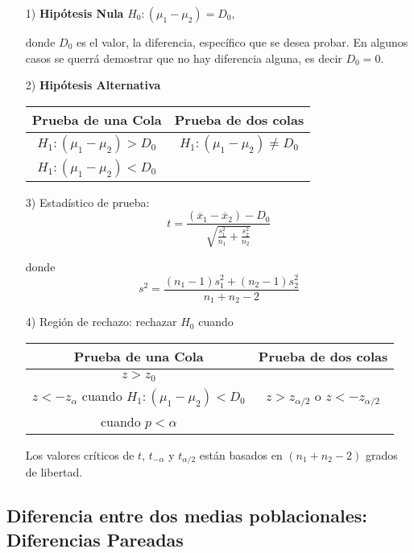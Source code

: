 \begin{itemize}
\begin{itemize}
\item[1) ] \textbf{Hip\'otesis Nula} $H_{0}:\left(\mu_{1}-\mu_{2}\right)=D_{0}$,\medskip

donde $D_{0}$ es el valor, la diferencia, espec\'ifico que se desea probar. En algunos casos se querr\'a demostrar que no hay diferencia alguna, es decir $D_{0}=0$.

\item[2) ] \textbf{Hip\'otesis Alternativa}
\begin{tabular}{cc}\hline
\textbf{Prueba de una Cola} & \textbf{Prueba de dos colas}\\\hline
$H_{1}:\left(\mu_{1}-\mu_{2}\right)>D_{0}$ & $H_{1}:\left(\mu_{1}-\mu_{2}\right)\neq D_{0}$\\ 
$H_{1}:\left(\mu_{1}-\mu_{2}\right)<D_{0}$&\\
\end{tabular}

\item[3) ] Estad\'istico de prueba:
$$t=\frac{\left(\overline{x}_{1}-\overline{x}_{2}\right)-D_{0}}{\sqrt{\frac{s^{2}_{1}}{n_{1}}+\frac{s^{2}_{2}}{n_{2}}}}$$


donde $$s^{2}=\frac{\left(n_{1}-1\right)s_{1}^{2}+\left(n_{2}-1\right)s_{2}^{2}}{n_{1}+n_{2}-2}$$

\item[4) ] Regi\'on de rechazo: rechazar $H_{0}$ cuando
\begin{tabular}{cc}\hline
\textbf{Prueba de una Cola} & \textbf{Prueba de dos colas}\\\hline
$z>z_{0}$ & \\
$z<-z_{\alpha}$ cuando $H_{1}:\left(\mu_{1}-\mu_{2}\right)<D_{0}$&$z>z_{\alpha/2}$ o $z<-z_{\alpha/2}$\\
 cuando $p<\alpha$&\\
\end{tabular}
Los valores cr\'iticos de $t$, $t_{-\alpha}$ y $t_{\alpha/2}$ est\'an basados en $\left(n_{1}+n_{2}-2\right)$ grados de libertad.
\end{itemize}
\subsection*{Diferencia entre dos medias poblacionales: Diferencias Pareadas}


\end{itemize}

